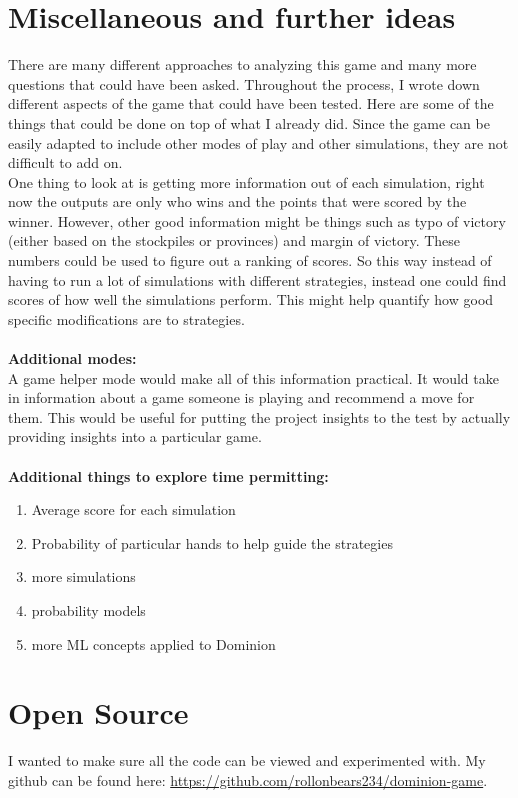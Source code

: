 \documentclass[11pt, oneside]{article}   	%
\begin{document}
\section{Miscellaneous and further ideas}

There are many different approaches to analyzing this game and many more questions that could have been asked. Throughout the process, I wrote down different aspects of the game that could have been tested. Here are some of the things that could be done on top of what I already did. Since the game can be easily adapted to include other modes of play and other simulations, they are not difficult to add on. \\

One thing to look at is getting more information out of each simulation, right now the outputs are only who wins and the points that were scored by the winner. However, other good information might be things such as typo of victory (either based on the stockpiles or provinces) and margin of victory. These numbers could be used to figure out a ranking of scores. So this way instead of having to run a lot of simulations with different strategies, instead one could find scores of how well the simulations perform. This might help quantify how good specific modifications are to strategies. 
\\
\\
\textbf{Additional modes:}\\
A game helper mode would make all of this information practical. It would take in information about a game someone is playing and recommend a move for them. This would be useful for putting the project insights to the test by actually providing insights into a particular game. 
\\
\\
\textbf{Additional things to explore time permitting:}\\
	\begin{enumerate}
 		 \item Average score for each simulation
		 \item Probability of particular hands to help guide the strategies
		 \item more simulations
		 \item probability models
		 \item more ML concepts applied to Dominion
	\end{enumerate}


\section{Open Source}

I wanted to make sure all the code can be viewed and experimented with. My github can be found here: \url{https://github.com/rollonbears234/dominion-game}. 



\end{document}
